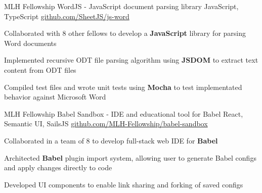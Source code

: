 \documentclass[]{awesome-cv}
\begin{document}
\vspace{-5mm}
\begin{cventries}
  \vspace{-1mm}
	\cventry
  {MLH Fellowship}
  {WordJS - JavaScript document parsing library}
  {JavaScript, TypeScript}
  {\href{https://github.com/SheetJS/js-word}{github.com/SheetJS/js-word}}
  {\begin{cvitems}
    \item {Collaborated with 8 other fellows to develop a \textbf{JavaScript} library
      for parsing Word documents}
    \item{Implemented recursive ODT file parsing algorithm using \textbf{JSDOM}
      to extract text content from ODT files}
    \item{Compiled test files and wrote unit tests using \textbf{Mocha} to test
      implementated behavior against Microsoft Word}
    \end{cvitems}}

  \vspace{-3mm}
	\cventry
  {MLH Fellowship}
  {Babel Sandbox - IDE and educational tool for Babel}
  {React, Semantic UI, SailsJS}
  {\href{https://github.com/MLH-Fellowship/babel-sandbox}{github.com/MLH-Fellowship/babel-sandbox}}
  {\begin{cvitems}
    \item{Collaborated in a team of 8 to develop full-stack web IDE for
      \textbf{Babel}}
    \item{Architected \textbf{Babel} plugin import system, allowing user to
      generate Babel configs and apply changes directly to code}
    \item{Developed UI components to enable link sharing and forking of saved
      configs}
    \end{cvitems}}



\end{cventries}
\end{document}
